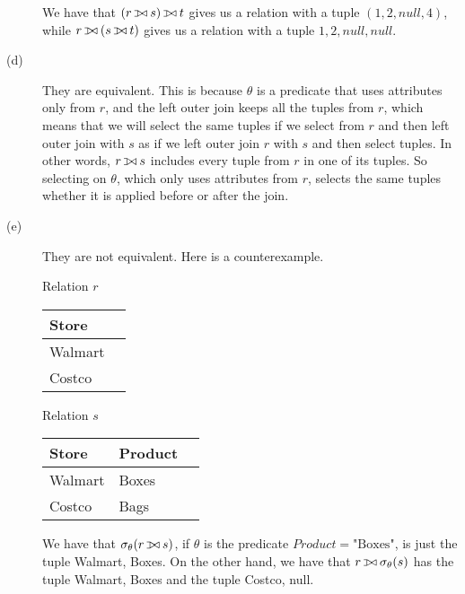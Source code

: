 \documentclass{article}
\def\ojoin{\setbox0=\hbox{$\bowtie$}%
    \rule[-.02ex]{.25em}{.4pt}\llap{\rule[\ht0]{.25em}{.4pt}}}
\def\leftouterjoin{\mathbin{\ojoin\mkern-5.8mu\bowtie}}
\begin{document}
\begin{description}
        We have that $(r \leftouterjoin s) \leftouterjoin t$ gives us a
        relation with a tuple $(1,2,null,4)$, while $r \leftouterjoin (
            s \leftouterjoin t)$ gives us a relation with a tuple
                $1,2,null,null$.
    \item[(d)]
        They are equivalent. This is because $\theta$ is a predicate that uses
        attributes only from $r$, and the left outer join keeps all the tuples
        from $r$, which means that we will select the same tuples
        if we select from $r$ and then left outer join with $s$ as if we
        left outer join $r$ with $s$ and then select tuples. In other words,
        $r \leftouterjoin s$ includes every tuple from $r$ in one of its tuples.
        So selecting on $\theta$, which only uses attributes from $r$,
        selects the same tuples whether it is applied before or after the join.
    \item[(e)]
        They are not equivalent. Here is a counterexample.

        \begin{center}
            Relation $r$
            \begin{tabular}{ | l | p{5cm} |}
                \hline
                \textbf{Store} \\ \hline
                Walmart \\ \hline
                Costco \\ \hline
            \end{tabular}
        \end{center}

        \begin{center}
            Relation $s$
            \begin{tabular}{ | l | l | p{5cm} |}
                \hline
                \textbf{Store} & \textbf{Product} \\ \hline
                Walmart & Boxes \\ \hline
                Costco & Bags \\ \hline
            \end{tabular}
        \end{center}

        We have that $\sigma_{\theta}(r \leftouterjoin s)$, if $\theta$ is the
        predicate $Product = \text{"Boxes"}$, is just the tuple Walmart,
        Boxes. On the other hand, we have that $r \leftouterjoin
        \sigma_{\theta}(s)$ has the tuple Walmart, Boxes and the tuple
        Costco, null.
\end{description}
\end{document}
